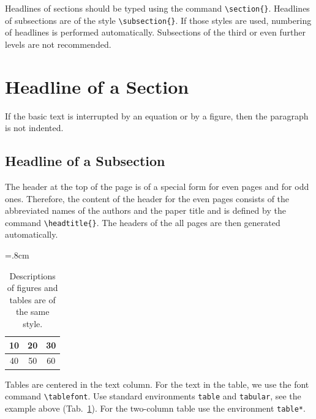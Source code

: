 \documentclass{poster15}
\begin{document}
Headlines of sections should be typed using the command \verb+\section{}+. Headlines of subsections are of the style \verb+\subsection{}+. If those styles are used, numbering of headlines is performed automatically. Subsections of the third or even further levels are not recommended.

\section{Headline of a Section}
If the basic text is interrupted by an equation or by a figure, then the paragraph is not indented.

\subsection{Headline of a Subsection}
The header at the top of the page is of a special form for even pages and for odd ones. Therefore, the content of the header for the even pages consists of the abbreviated names of the authors and the paper title and is defined by the command \verb+\headtitle{}+. The headers of the all pages are then generated automatically.

%
\begin{table}[h]
\begin{center}
{\renewcommand{\arraystretch}{1.4}
\tabcolsep=.8cm
\tablefont
\begin{tabular}{|c|c|c|}
\hline
10
&20
&30\\
\hline
40
&50
&60\\
\hline
\end{tabular}}
\caption{Descriptions of figures and tables are of the same style.}
\label{tab}
\end{center}
\end{table}
Tables are centered in the text column. For the text in the table, we use the font command \verb+\tablefont+. Use standard environments \verb+table+ and \verb+tabular+, see the example above (Tab.~\ref{tab}). For the two-column table use the environment \verb+table*+. 
\end{document}
